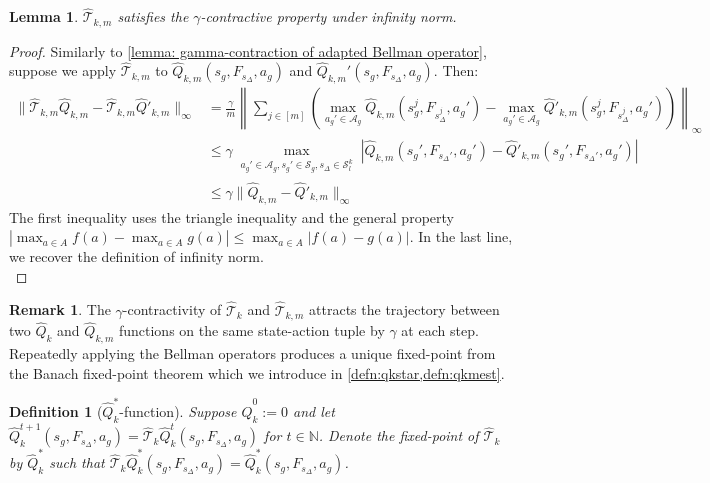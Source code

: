 \documentclass{article}
\theoremstyle{plain}
\newtheorem{lemma}[theorem]{Lemma}
\theoremstyle{definition}
\newtheorem{definition}[theorem]{Definition}
\newtheorem{remark}[theorem]{Remark}
\def\N{\mathbb{N}}
\begin{document}
\begin{lemma}
{$\hat{\mathcal{T}}_{k,m}$ satisfies the $\gamma$-contractive property under infinity norm.\label{lemma: gamma-contraction of empirical adapted Bellman operator}}
\end{lemma}
\begin{proof}
Similarly to \cref{lemma: gamma-contraction of adapted Bellman operator}, suppose we apply $\hat{\mathcal{T}}_{k,m}$ to $\hat{Q}_{k,m}(s_g,F_{s_\Delta},a_g)$ and $\hat{Q}_{k,m}'(s_g,F_{s_\Delta},a_g)$. Then:
\begin{align*}    \|\hat{\mathcal{T}}_{k,m}\hat{Q}_{k,m} - \hat{\mathcal{T}}_{k,m}\hat{Q}'_{k,m}\|_\infty &= \frac{\gamma}{m}\left\|\sum_{j\in [m]} (\max_{a_g'\in\mathcal{A}_g} \hat{Q}_{k,m}(s_g^j,F_{s_\Delta^j},a_g') -  \max_{a_g'\in\mathcal{A}_g} \hat{Q}'_{k,m}(s_g^j,F_{s_\Delta^j},a_g'))\right\|_\infty \\
    &\leq \gamma \max_{\substack{a_g'\in\mathcal{A}_g, s_g' \in\mathcal{S}_g, s_\Delta\in\mathcal{S}_l^k}}|\hat{Q}_{k,m}(s_g', F_{s_\Delta'}, a_g') - \hat{Q}'_{k,m}(s_g', F_{s_\Delta'}, a_g')| \\
    &\leq \gamma \|\hat{Q}_{k,m} - \hat{Q}'_{k,m}\|_\infty
\end{align*} 
 The first inequality uses the triangle inequality and the general property $|\max_{a\in A}f(a) - \max_{a\in A}g(a)| \leq \max_{a\in A}|f(a) - g(a)|$. In the last line, we recover the definition of infinity norm.\qedhere\\
\end{proof} 
 
 
\begin{remark}\label{remark: gamma-contractive of ad_T}The $\gamma$-contractivity of $\hat{\mathcal{T}}_k$ and $\hat{\mathcal{T}}_{k,m}$ attracts the trajectory between two $\hat{Q}_k$ and $\hat{Q}_{k,m}$ functions on the same state-action tuple by $\gamma$ at each step. Repeatedly applying the Bellman operators produces a unique fixed-point from the Banach fixed-point theorem which we introduce in \cref{defn:qkstar,defn:qkmest}.\\
\end{remark}

\begin{definition}[$\hat{Q}_k^*$-function]\label{defn:qkstar}\emph{Suppose $\hat{Q}_k^0:=0$ and let $\hat{Q}_k^{t+1}(s_g,F_{s_\Delta},a_g) = \hat{\mathcal{T}}_k \hat{Q}_k^t(s_g,F_{s_\Delta},a_g)$
    for $t\in\N$. Denote the fixed-point of $\hat{\mathcal{T}}_k$ by $\hat{Q}^*_k$ such that $\hat{\mathcal{T}}_k \hat{Q}^*_k(s_g,F_{s_\Delta},a_g) = \hat{Q}^*_k(s_g,F_{s_\Delta},a_g)$.}\\
\end{definition}
\end{document}
